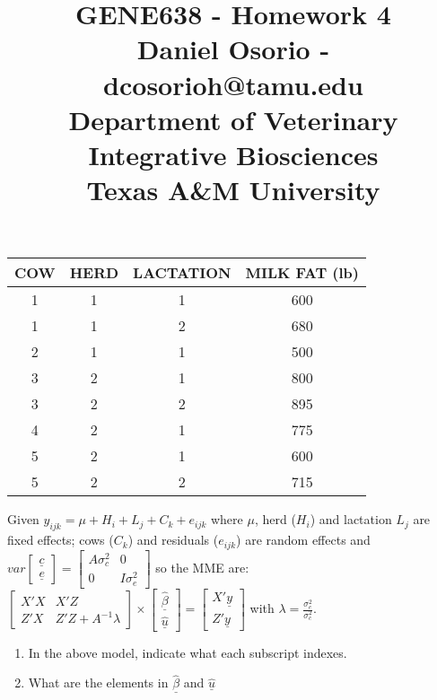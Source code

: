 \documentclass[12pt,a4paper]{paper}
\begin{document}
\title{GENE638 - Homework 4\\\small{Daniel Osorio - dcosorioh@tamu.edu\\Department of Veterinary Integrative Biosciences\\Texas A\&M University}}
\maketitle

\begin{center}
\begin{tabular}{|c|c|c|c|}
\hline
COW&HERD&LACTATION&MILK FAT (lb)\\
\hline
1&1&1&600\\
\hline
1&1&2&680\\
\hline
2&1&1&500\\
\hline
3&2&1&800\\
\hline
3&2&2&895\\
\hline
4&2&1&775\\
\hline
5&2&1&600\\
\hline
5&2&2&715\\
\hline
\end{tabular}
\end{center}
Given $y_{ijk} = \mu + H_{i} + L_{j} + C_{k} + e_{ijk}$ where $\mu$, herd ($H_{i}$) and lactation $L_{j}$ are fixed effects; cows ($C_{k}$) and residuals ($e_{ijk}$) are random effects and $var\left[\begin{array}{c}\underline{c}\\\underline{e}\end{array}\right] = \left[\begin{array}{cc}A\sigma^{2}_{c}&0\\0&I\sigma^{2}_{e}\end{array}\right]$ so the MME are: $\left[\begin{array}{cc}X'X&X'Z\\Z'X&Z'Z+A^{-1}\lambda\end{array}\right]\times \left[\begin{array}{c}\underline{\hat{\beta}}\\\underline{\hat{u}}\end{array}\right]=\left[\begin{array}{c}X'\underline{y}\\Z'\underline{y}\end{array}\right]$ with $\lambda = \frac{\sigma^{2}_{e}}{\sigma^{2}_{c}}$.
\begin{enumerate}
\item In the above model, indicate what each subscript indexes.
\item What are the elements in $\underline{\hat{\beta}}$ and $\underline{\hat{u}}$
\end{enumerate}
\end{document}
